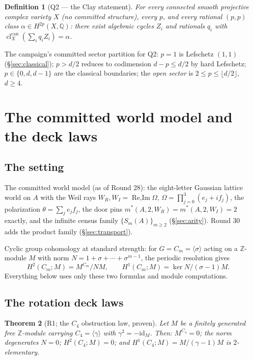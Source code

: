 \documentclass[11pt]{article}
\newcommand{\Z}{\mathbb Z}
\newcommand{\Q}{\mathbb Q}
\newcommand{\Cl}{\operatorname{cl}}
\newcommand{\cyc}{C_m}
\newtheorem{theorem}{Theorem}[section]
\newtheorem{definition}[theorem]{Definition}
\begin{document}
\begin{definition}[Q2 --- the Clay statement]
For \emph{every} connected smooth projective complex variety $X$ (no
committed structure), every $p$, and every rational $(p,p)$ class
$\alpha\in H^{2p}(X,\Q)$: there exist algebraic cycles $Z_i$ and rationals
$q_i$ with $\Cl^{\mathrm{can}}_X(\sum_i q_iZ_i)=\alpha$.
\end{definition}

The campaign's committed sector partition for Q2: $p=1$ is Lefschetz
$(1,1)$ (\S\ref{sec:classical}); $p>d/2$ reduces to codimension $d-p\le d/2$
by hard Lefschetz; $p\in\{0,d,d-1\}$ are the classical boundaries; the
\emph{open sector} is $2\le p\le\lfloor d/2\rfloor$, $d\ge4$.

\section{The committed world model and the deck laws}\label{sec:deck}

\subsection{The setting}

The committed world model (as of Round 28): the eight-letter Gaussian
lattice world on $A$ with the Weil rays
$W_R,W_I=\operatorname{Re,Im}\Omega$,
$\Omega=\prod_{j=0}^{3}(e_j+if_j)$, the polarization
$\theta=\sum_je_jf_j$, the door pins $m^\ast(A,2,W_R)=m^\ast(A,2,W_I)=2$
exactly, and the infinite census family $\{S_m(A)\}_{m\ge2}$
(\S\ref{sec:arity}). Round 30 adds the product family (\S\ref{sec:transport}).

Cyclic group cohomology at standard strength: for $G=\cyc=\langle\sigma\rangle$
acting on a $\Z$-module $M$ with norm $N=1+\sigma+\cdots+\sigma^{m-1}$, the
periodic resolution gives
\[
H^2(\cyc;M)=M^{\cyc}/NM,\qquad H^1(\cyc;M)=\ker N/(\sigma-1)M.
\]
Everything below uses only these two formulas and module computations.

\subsection{The rotation deck laws}

\begin{theorem}[R1; the $C_4$ obstruction law, proven]\label{thm:R1}
Let $M$ be a finitely generated free $\Z$-module carrying
$C_4=\langle\gamma\rangle$ with $\gamma^2=-\mathrm{id}_M$. Then:
$M^{C_4}=0$; the norm degenerates $N=0$; $H^2(C_4;M)=0$; and
$H^1(C_4;M)=M/(\gamma-1)M$ is $2$-elementary.
\end{theorem}
\end{document}
